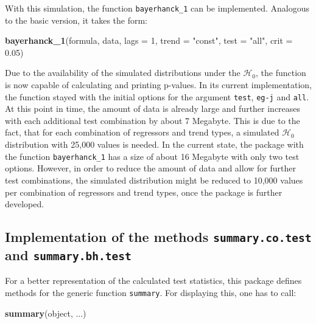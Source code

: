 \documentclass[12pt,a4paper]{article}
\newenvironment{Shaded}{\begin{snugshade}}{\end{snugshade}}
\newcommand{\DataTypeTok}[1]{\textcolor[rgb]{0.13,0.29,0.53}{#1}}
\newcommand{\DecValTok}[1]{\textcolor[rgb]{0.00,0.00,0.81}{#1}}
\newcommand{\FloatTok}[1]{\textcolor[rgb]{0.00,0.00,0.81}{#1}}
\newcommand{\KeywordTok}[1]{\textcolor[rgb]{0.13,0.29,0.53}{\textbf{#1}}}
\newcommand{\NormalTok}[1]{#1}
\newcommand{\StringTok}[1]{\textcolor[rgb]{0.31,0.60,0.02}{#1}}
\begin{document}
With this simulation, the function \texttt{bayerhanck\_1} can be
implemented. Analogous to the basic version, it takes the form:

\begin{Shaded}
\begin{Highlighting}[]
\KeywordTok{bayerhanck_1}\NormalTok{(formula, data, }\DataTypeTok{lags =} \DecValTok{1}\NormalTok{, }\DataTypeTok{trend =} \StringTok{"const"}\NormalTok{, }
           \DataTypeTok{test =} \StringTok{"all"}\NormalTok{, }\DataTypeTok{crit =} \FloatTok{0.05}\NormalTok{)}
\end{Highlighting}
\end{Shaded}

Due to the availability of the simulated distributions under the
\(\mathcal{H}_0\), the function is now capable of calculating and
printing p-values. In its current implementation, the function stayed
with the initial options for the argument \texttt{test}, \texttt{eg-j}
and \texttt{all}. At this point in time, the amount of data is already
large and further increases with each additional test combination by
about 7 Megabyte. This is due to the fact, that for each combination of
regressors and trend types, a simulated \(\mathcal{H}_0\) distribution
with 25,000 values is needed. In the current state, the package with the
function \texttt{bayerhanck\_1} has a size of about 16 Megabyte with
only two test options. However, in order to reduce the amount of data
and allow for further test combinations, the simulated distribution
might be reduced to 10,000 values per combination of regressors and
trend types, once the package is further developed.

\hypertarget{implementation-of-the-methods-summary.co.test-and-summary.bh.test}{%
\subsection{\texorpdfstring{Implementation of the methods
\texttt{summary.co.test} and
\texttt{summary.bh.test}}{Implementation of the methods summary.co.test and summary.bh.test}}\label{implementation-of-the-methods-summary.co.test-and-summary.bh.test}}

For a better representation of the calculated test statistics, this
package defines methods for the generic function \texttt{summary}. For
displaying this, one has to call:

\begin{Shaded}
\begin{Highlighting}[]
\KeywordTok{summary}\NormalTok{(object, ...)}
\end{Highlighting}
\end{Shaded}
\end{document}
